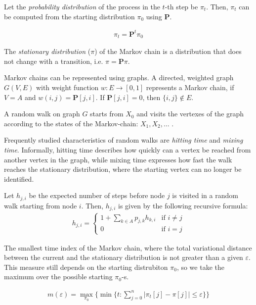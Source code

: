 Let the \textit{probability distribution} of the process in the $t$-th step be $\pi_t$. Then, $\pi_t$ can be computed from the starting distribution $\pi_0$ using $\mathbf{P}$.

\begin{align*}
\pi_{t} = \mathbf{P}^t\pi_{0}
\end{align*}

The \textit{stationary distribution} ($\pi$) of the Markov chain is a distribution that does not change with a transition, i.e. $\pi = \mathbf{P}\pi$.

Markov chains can be represented using graphs. A directed, weighted graph $G(V,E)$ with weight function $w:E\rightarrow{}[0,1]$ represents a Markov chain, if $V=A$ and $w(i,j) = \mathbf{P}[j,i]$. If $\mathbf{P}[j,i] = 0$, then $\{i,j\} \not\in E$.

A random walk on graph $G$ starts from $X_0$ and visits the vertexes of the graph according to the states of the Markov-chain: $X_1,X_2,\dots$ .

Frequently studied characteristics of random walks are \textit{hitting time}\cite{XiaReview} and \textit{mixing time}\cite{MitzenmacherProbability}. Informally, hitting time describes how quickly can a vertex be reached from another vertex in the graph, while mixing time expresses how fast the walk reaches the stationary distribution, where the starting vertex can no longer be identified.

\begin{definition} Let $h_{j,i}$ be the expected number of steps before node $j$ is visited in a random walk starting from node $i$.
Then, $h_{j,i}$ is given by the following recursive formula:
\begin{align*}
    h_{j,i} = \left\{
        \begin{array}{lr}
            1 + \sum\limits_{k\in{}A}p_{j,k}h_{k,i} & \text{if } i\neq{}j\\
            0 & \text{if } i=j
        \end{array}
    \right.
\end{align*}
\end{definition}

\begin{definition} The smallest time index of the Markov chain, where the total variational distance between the current and the stationary distribution is not greater than a given $\varepsilon$. This measure still depends on the starting distrubiton $\pi_0$, so we take the maximum over the possible starting $\pi_0$-s.

\begin{align*}
m(\varepsilon) = \max\limits_{\pi_0}\{\min\{t : \sum\limits_{j=0}^{n}|\pi_t[j] - \pi[j]| \leq \varepsilon\}\}
\end{align*}

\end{definition}